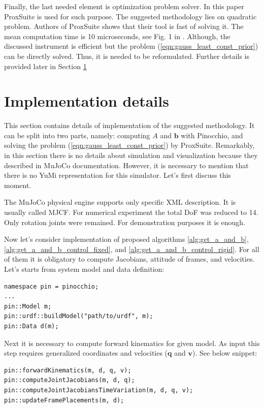 Finally, the last needed element is optimization problem solver. In this paper 
ProxSuite \cite{ProxQP} is used for such purpose. The suggested methodology lies 
on quadratic problem. Authors of ProxSuite shows that their tool is fast of 
solving it. The mean computation time is 10 microseconds, see Fig. 1 in 
\cite{ProxQP}. Although, the discussed instrument is efficient but the problem 
(\ref{eqn:gauss_least_const_prior}) can be directly solved. Thus, it is needed 
to be reformulated. Further details is provided later in Section \ref{sec:impl_details}

\section{Implementation details}
\label{sec:impl_details}

This section contains details of implementation of the suggested methodology. It 
can be split into two parts, namely: computing $A$ and $\mathbf{b}$ with Pinocchio, 
and solving the problem (\ref{eqn:gauss_least_const_prior}) by ProxSuite. 
Remarkably, in this section there is no details about simulation and visualization 
because they described in MuJoCo documentation. However, it is necessary to 
mention that there is no YuMi representation for this simulator. Let's 
first discuss this moment.

The MuJoCo physical engine supports only specific XML description. It is usually 
called MJCF. For numerical experiment the total DoF was reduced to 14. Only rotation 
joints were remained. For demonstration purposes it is enough.

Now let's consider implementation of proposed algorithms 
\ref{alg:get_a_and_b}, \ref{alg:get_a_and_b_control_fixed}, and 
\ref{alg:get_a_and_b_control_rigid}. For all of them it is obligatory to compute 
Jacobians, attitude of frames, and velocities. Let's starts from system model 
and data definition:

\begin{lstlisting}[caption={Model and data}, label=snp:model_and_data]
namespace pin = pinocchio;
...
pin::Model m;
pin::urdf::buildModel("path/to/urdf", m);
pin::Data d(m);
\end{lstlisting}

Next it is necessary to compute forward kinematics for given model. As input this 
step requires generalized coordinates and velocities ($\mathbf{q}$ and 
$\mathbf{v}$). See below snippet:

\begin{lstlisting}[caption={Forward kinematics}, label=snp:forward_kin]
pin::forwardKinematics(m, d, q, v);
pin::computeJointJacobians(m, d, q);
pin::computeJointJacobiansTimeVariation(m, d, q, v);
pin::updateFramePlacements(m, d);
\end{lstlisting}

